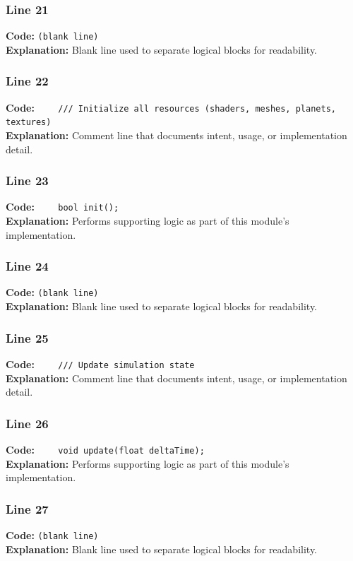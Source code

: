 \documentclass[11pt,a4paper]{article}
\begin{document}
\subsubsection*{Line 21}
\textbf{Code:} \texttt{(blank line)}\\
\textbf{Explanation:} Blank line used to separate logical blocks for readability.

\subsubsection*{Line 22}
\textbf{Code:} \verb|    /// Initialize all resources (shaders, meshes, planets, textures)|\\
\textbf{Explanation:} Comment line that documents intent, usage, or implementation detail.

\subsubsection*{Line 23}
\textbf{Code:} \verb|    bool init();|\\
\textbf{Explanation:} Performs supporting logic as part of this module's implementation.

\subsubsection*{Line 24}
\textbf{Code:} \texttt{(blank line)}\\
\textbf{Explanation:} Blank line used to separate logical blocks for readability.

\subsubsection*{Line 25}
\textbf{Code:} \verb|    /// Update simulation state|\\
\textbf{Explanation:} Comment line that documents intent, usage, or implementation detail.

\subsubsection*{Line 26}
\textbf{Code:} \verb|    void update(float deltaTime);|\\
\textbf{Explanation:} Performs supporting logic as part of this module's implementation.

\subsubsection*{Line 27}
\textbf{Code:} \texttt{(blank line)}\\
\textbf{Explanation:} Blank line used to separate logical blocks for readability.
\end{document}
